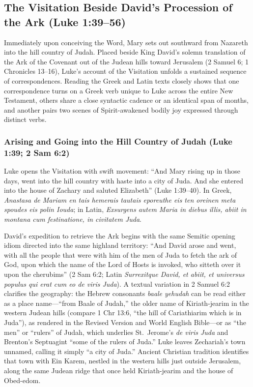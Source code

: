 \subsection{The Visitation Beside David's Procession of the Ark (Luke 1:39--56)}

Immediately upon conceiving the Word, Mary sets out southward from Nazareth into the hill country of Judah. Placed beside King David's solemn translation of the Ark of the Covenant out of the Judean hills toward Jerusalem (2 Samuel 6; 1 Chronicles 13--16), Luke's account of the Visitation unfolds a sustained sequence of correspondences. Reading the Greek and Latin texts closely shows that one correspondence turns on a Greek verb unique to Luke across the entire New Testament, others share a close syntactic cadence or an identical span of months, and another pairs two scenes of Spirit-awakened bodily joy expressed through distinct verbs.

\subsubsection{Arising and Going into the Hill Country of Judah (Luke 1:39; 2 Sam 6:2)}

Luke opens the Visitation with swift movement: ``And Mary rising up in those days, went into the hill country with haste into a city of Juda. And she entered into the house of Zachary and saluted Elizabeth'' (Luke 1:39--40). In Greek, \textit{Anastasa de Mariam en tais hemerais tautais eporeuthe eis ten oreinen meta spoudes eis polin Iouda}; in Latin, \textit{Exsurgens autem Maria in diebus illis, abiit in montana cum festinatione, in civitatem Juda}.

David's expedition to retrieve the Ark begins with the same Semitic opening idiom directed into the same highland territory: ``And David arose and went, with all the people that were with him of the men of Juda to fetch the ark of God, upon which the name of the Lord of Hosts is invoked, who sitteth over it upon the cherubims'' (2 Sam 6:2; Latin \textit{Surrexitque David, et abiit, et universus populus qui erat cum eo de viris Juda}). A textual variation in 2 Samuel 6:2 clarifies the geography: the Hebrew consonants \textit{baale yehudah} can be read either as a place name---``from Baale of Judah,'' the older name of Kiriath-jearim in the western Judean hills (compare 1 Chr 13:6, ``the hill of Cariathiarim which is in Juda''), as rendered in the Revised Version and World English Bible---or as ``the men'' or ``rulers'' of Judah, which underlies St.\ Jerome's \textit{de viris Juda} and Brenton's Septuagint ``some of the rulers of Juda.'' Luke leaves Zechariah's town unnamed, calling it simply ``a city of Juda.'' Ancient Christian tradition identifies that town with Ein Karem, nestled in the western hills just outside Jerusalem, along the same Judean ridge that once held Kiriath-jearim and the house of Obed-edom.


